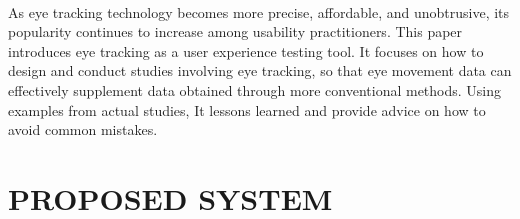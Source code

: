 \documentclass[a4paper,12pt,oneside]{article}
\begin{document}
\paragraph{}
As eye tracking technology becomes more precise, affordable, and unobtrusive, its popularity continues to increase among usability practitioners. This paper introduces eye tracking as a user experience testing tool. It focuses on how to design and conduct studies involving eye tracking, so that eye movement data can effectively supplement data obtained through more conventional methods. Using examples from actual studies, It lessons learned and provide advice on how to avoid common mistakes.

%

\newpage
\section{PROPOSED SYSTEM}
\end{document}
